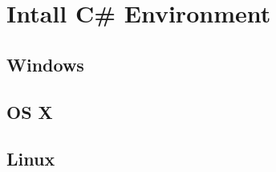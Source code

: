 \documentclass[../main.tex]{subfiles}
\begin{document}
    \chapter{Intall C\# Environment}
        \section{Windows}
        \section{OS X}
        \section{Linux}
\end{document}
